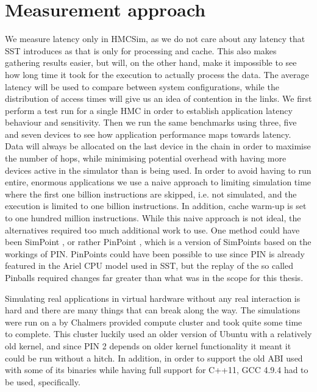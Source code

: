 

\section{Measurement approach}
We measure latency only in HMCSim, as we do not care about any latency that SST introduces as that is only for processing and cache. This also makes gathering results easier, but will, on the other hand, make it impossible to see how long time it took for the execution to actually process the data. The average latency will be used to compare between system configurations, while the distribution of access times will give us an idea of contention in the links. We first perform a test run for a single HMC in order to establish application latency behaviour and sensitivity. Then we run the same benchmarks using three, five and seven devices to see how application performance maps towards latency. Data will always be allocated on the last device in the chain in order to maximise the number of hops, while minimising potential overhead with having more devices active in the simulator than is being used. In order to avoid having to run entire, enormous applications we use a naive approach to limiting simulation time where the first one billion instructions are skipped, i.e. not simulated, and the execution is limited to one billion instructions. In addition, cache warm-up is set to one hundred million instructions. While this naive approach is not ideal, the alternatives required too much additional work to use. One method could have been SimPoint \cite{hamerly2005simpoint}, or rather PinPoint \cite{pinplay2010patil}, which is a version of SimPoints based on the workings of PIN. PinPoints could have been possible to use since PIN is already featured in the Ariel CPU model used in SST, but the replay of the so called Pinballs required changes far greater than what was in the scope for this thesis.
\bigskip

Simulating real applications in virtual hardware without any real interaction is hard and there are many things that can break along the way. The simulations were run on a by Chalmers provided compute cluster and took quite some time to complete. This cluster luckily used an older version of Ubuntu with a relatively old kernel, and since PIN 2 depends on older kernel functionality it meant it could be run without a hitch. In addition, in order to support the old ABI used with some of its binaries while having full support for C++11, GCC 4.9.4 had to be used, specifically. 
\bigskip